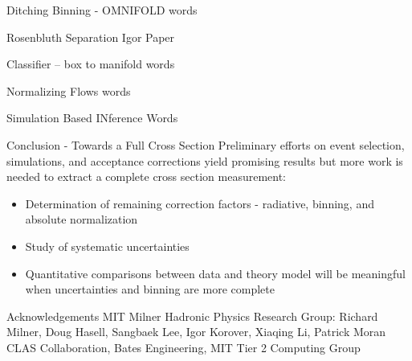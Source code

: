 \documentclass[aspectratio=169]{beamer}
\begin{document}
\begin{frame}{Ditching Binning - OMNIFOLD}
words

\end{frame}

\begin{frame}{Rosenbluth Separation}
Igor Paper

\end{frame}

\begin{frame}{Classifier -- box to manifold}
words

\end{frame}


\begin{frame}{Normalizing Flows}
words

\end{frame}

\begin{frame}{Simulation Based INference}
Words
\end{frame}

\begin{frame}{Conclusion - Towards a Full Cross Section}
Preliminary efforts on event selection, simulations, and acceptance corrections yield promising results but more work is needed to extract a complete cross section measurement:
\vspace{0.4cm}
\begin{itemize}
    \setlength\itemsep{1em}
    \item Determination of remaining correction factors - radiative, binning, and absolute normalization
    \item Study of systematic uncertainties 
    \item Quantitative comparisons between data and theory model will be meaningful when uncertainties and binning are more complete
\end{itemize}
    
\end{frame}
\begin{frame}{Acknowledgements}
MIT Milner Hadronic Physics Research Group: Richard Milner, Doug Hasell, Sangbaek Lee, Igor Korover, Xiaqing Li, Patrick Moran\\
CLAS Collaboration, Bates Engineering, MIT Tier 2 Computing Group
    
\end{frame}
\end{document}
